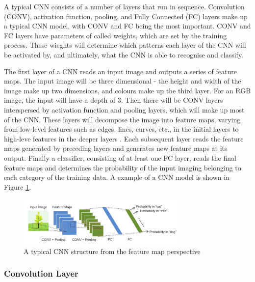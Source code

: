 \documentclass[12pt]{article}
\begin{document}
A typical CNN consists of a number of layers that run in sequence. Convolution (CONV), activation function, pooling, and Fully Connected (FC) layers make up a typical CNN model, with CONV and FC being the most important. CONV and FC layers have parameters of called weights, which are set by the training process. These wieghts will determine which patterns each layer of the CNN will be activated by, and ultimately, what the CNN is able to recognise and classify. 

The first layer of a CNN reads an input image and outputs a series of feature maps. The input image will be three dimensional - the height and width of the image make up two dimensions, and colours make up the third layer. For an RGB image, the input will have a depth of 3. Then there will be CONV layers interspersed by activation function and pooling layers, which will make up most of the CNN. These layers will decompose the image into feature maps, varying from low-level features such as edges, lines, curves, etc., in the initial layers to high-leve features in the deeper layers \cite{fpgaCnnAccelerator}. Each subsequent layer reads the feature maps generated by preceding layers and generates new feature maps at its output. Finally a classifier, consisting of at least one FC layer, reads the final feature maps and determines the probability of the input imaging belonging to each category of the training data. A example of a CNN model is shown in Figure \ref{fig:typicalCNN}.
\begin{figure}

\centering
\includegraphics[width=0.75\textwidth]{../figures/typicalCnn}

  \caption{A typical CNN structure from the feature map perspective \cite{embeddedFpgaCnn} \label{fig:typicalCNN}}

\end{figure}

\subsubsection{Convolution Layer}
\label{sec:Background-CNN-Conv}
\vspace{-12pt}
\end{document}
